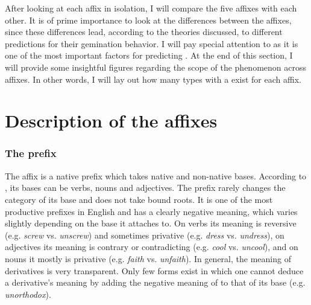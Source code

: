After looking at each affix in isolation, I will compare the five affixes with each other. It is of prime importance to look at the differences between the affixes, since these differences lead, according to the theories discussed, to different predictions for their gemination behavior. I will pay special attention to  as it is one of the most important factors for predicting .  
At the end of this section, I will provide some insightful figures regarding the scope of the phenomenon across affixes. In other words, I will lay out how many types with a  exist for each affix.

\section{Description of the affixes}

\subsubsection{The prefix } {\label{description un}}

The affix  is a native prefix which takes native and non-native bases. According to \citet[ 355, 361, 371 ff]{Bauer.2013}, its bases can be verbs, nouns and adjectives. The prefix rarely changes the category of its base and does not take bound roots. It is one of the most productive prefixes in English and has a clearly negative meaning, which varies slightly depending on the base it attaches to. On verbs its meaning is reversive (e.g. \textit{screw} vs. \textit{unscrew}) and sometimes privative (e.g. \textit{dress} vs. \textit{undress}), on adjectives its meaning is contrary or contradicting (e.g. \textit{cool} vs. \textit{uncool}), and on nouns it mostly is privative (e.g. \textit{faith} vs. \textit{unfaith}).
In general, the meaning of derivatives is very transparent. Only few forms exist in which one cannot deduce a derivative's meaning by adding the negative meaning of  to that of its base (e.g. \textit{unorthodox}).

